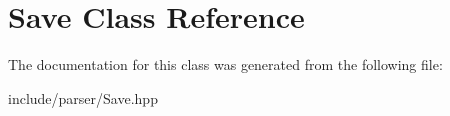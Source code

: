 \hypertarget{classSave}{}\section{Save Class Reference}
\label{classSave}


The documentation for this class was generated from the following file\+:\begin{DoxyCompactItemize}
\item 
include/parser/Save.\+hpp\end{DoxyCompactItemize}
